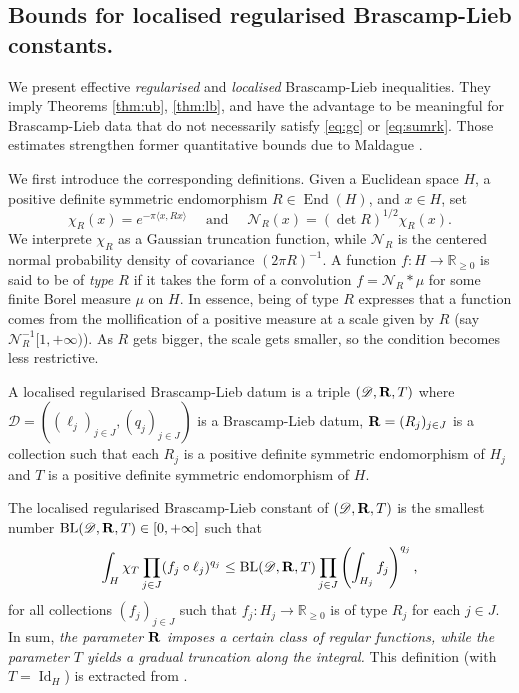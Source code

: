 \documentclass[a4paper,english]{amsart}
\theoremstyle{definition}
\newcommand{\R}{\mathbb{R}}
\newcommand{\sN}{\mathscr{N}}
\newcommand{\bba}{\boldsymbol{\alpha}}
\newcommand{\1}{\mathbbm{1}}
\newcommand{\bbR}{{\bf{R}}}
\newcommand{\sD} {{\mathscr D}}
\DeclareMathOperator{\End}{End}
\newcommand{\dd}{\,\mathrm{d}}
\DeclareMathOperator{\Id}{Id}
\DeclareMathOperator{\BL}{BL}
\begin{document}
\bigskip
\subsection{Bounds for   localised regularised Brascamp-Lieb constants.} \label{Sec-bndBL2}
We present effective  \emph{regularised} and \emph{localised}  Brascamp-Lieb inequalities.
They imply Theorems \ref{thm:ub}, \ref{thm:lb}, and have the advantage to be meaningful for  Brascamp-Lieb data that do not necessarily satisfy \eqref{eq:gc} or \eqref{eq:sumrk}.
Those estimates strengthen former quantitative bounds due to Maldague \cite{Maldague22}.

\bigskip
We first introduce the corresponding definitions.
Given a Euclidean space $H$, a positive definite symmetric endomorphism $R \in \End(H)$, and $x\in H$, set
\begin{equation}\label{def-chi-sN}
\chi_{R}(x)= e^{- \pi \langle x, R x \rangle } \quad \text{ and }\quad \sN_{R}(x)=(\det R)^{1/2}\chi_{R}(x).
\end{equation}
We interprete $\chi_{R}$ as a Gaussian truncation function, while $\sN_{R}$ is the centered normal probability density of covariance $(2\pi R)^{-1}$.
A function $f : H \to \R_{\geq 0}$ is said to be of \emph{type $R$} if it takes the form of a convolution $f = \sN_R * \mu$ for some finite Borel measure $\mu$ on $H$.
In essence, being of type $R$ expresses that a function comes from the mollification of a positive measure at a scale given by $R$ (say $\sN_{R}^{-1}[1, +\infty)$). As $R$ gets bigger, the scale gets smaller, so the condition becomes less restrictive.

A   localised regularised Brascamp-Lieb datum is a triple $(\sD, \bbR, T)$ where
$\sD = ((\ell_j)_{j \in J}, (q_j)_{j \in J})$ is a Brascamp-Lieb datum,
$\bbR = (R_{j})_{j \in J}$ is a collection such that each $R_j$ is a positive definite symmetric endomorphism of $H_j$
and $T$ is a positive definite symmetric endomorphism of $H$.

The  localised regularised Brascamp-Lieb constant of $(\sD, \bbR, T)$ is the smallest number $\BL(\sD, \bbR, T)\in [0,+\infty]$ such that
\[
\int_{H} \chi_T \prod_{j \in J} (f_{j}\circ \ell_{j})^{q_{j}} \leq \BL(\sD, \bbR, T) \prod_{j \in J} \left(\int_{H_{j}} f_{j} \right)^{q_{j}},
\]
for all collections $(f_{j})_{j \in J}$ such that $f_j :  H_{j}\rightarrow \R_{\geq0}$ is of type $R_j$ for each $j \in J$. In sum,  \emph{the parameter $\bbR$ imposes a certain class of regular functions, while the parameter $T$ yields a gradual truncation along the integral.}
This definition (with $T = \Id_H$) is extracted from  \cite[Section 8]{BCCT08}.
\end{document}
